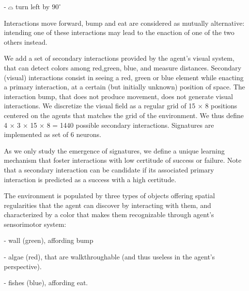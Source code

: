 \documentclass[conference]{IEEEtran}
\begin{document}
- \includegraphics[width=0.02\textwidth]{img/lt0.pdf} turn left by $90^\circ$ 

Interactions move forward, bump and eat are considered as mutually alternative: intending one of these interactions may lead to the enaction of one of the two others instead. %

We add a set of secondary interactions provided by the agent’s visual system, that can detect colors among {red,green, blue}, and measure distances.  Secondary (visual) interactions consist in seeing a red, green or blue element while enacting a primary interaction, at a certain (but initially unknown) position of space. The interaction bump, that does not produce movement, does not generate visual interactions. We discretize the visual field as a regular grid of 15 × 8 positions centered on the agents that matches the grid of the environment. We thus define 4 × 3 × 15 × 8 = 1440 possible secondary interactions.
Signatures are implemented as set of 6 neurons. %

As we only study the emergence of signatures, we define a unique learning mechanism that foster interactions with low certitude of success or failure. Note that a secondary interaction can be candidate if its associated primary interaction is predicted as a success with a high certitude.

The environment is populated by three types of objects offering spatial regularities that the agent can discover by interacting with them, and characterized by a color that makes them recognizable through agent's sensorimotor system:

- wall (green), affording bump

- algae (red), that are walkthroughable (and thus useless in the agent's perspective).

- fishes (blue), affording eat.
\end{document}
